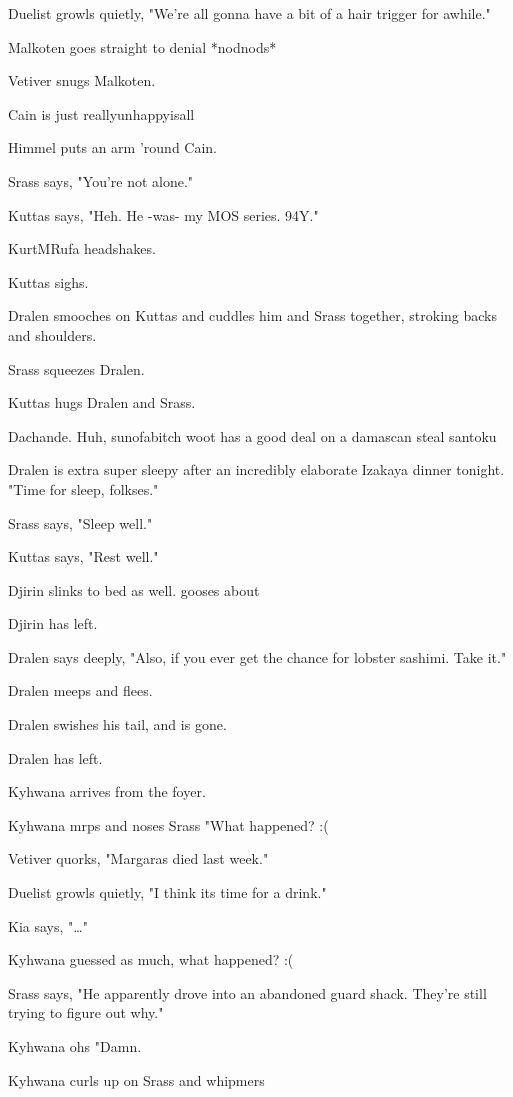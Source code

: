 \begin{hangparas}{2em}{1}
Duelist growls quietly, "We're all gonna have a bit of a hair trigger for awhile."

Malkoten goes straight to denial *nodnods*

Vetiver snugs Malkoten.

Cain is just reallyunhappyisall

Himmel puts an arm 'round Cain.

Srass says, "You're not alone."

Kuttas says, "Heh. He -was- my MOS series. 94Y."

KurtMRufa headshakes.

Kuttas sighs.

Dralen smooches on Kuttas and cuddles him and Srass together, stroking backs and shoulders.

Srass squeezes Dralen.

Kuttas hugs Dralen and Srass.

Dachande. Huh, sunofabitch woot has a good deal on a damascan steal santoku

Dralen is extra super sleepy after an incredibly elaborate Izakaya dinner tonight. "Time for sleep, folkses."

Srass says, "Sleep well."

Kuttas says, "Rest well."

Djirin slinks to bed as well.  gooses about

Djirin has left.

Dralen says deeply, "Also, if you ever get the chance for lobster sashimi. Take it."

Dralen meeps and flees.

Dralen swishes his tail, and is gone.

Dralen has left.

Kyhwana arrives from the foyer.

Kyhwana mrps and noses Srass "What happened? :(

Vetiver quorks, "Margaras died last week."

Duelist growls quietly, "I think its time for a drink."

Kia says, "\ldots{}"

Kyhwana guessed as much, what happened? :(

Srass says, "He apparently drove into an abandoned guard shack.  They're still trying to figure out why."

Kyhwana ohs "Damn.

Kyhwana curls up on Srass and whipmers


\end{hangparas}
